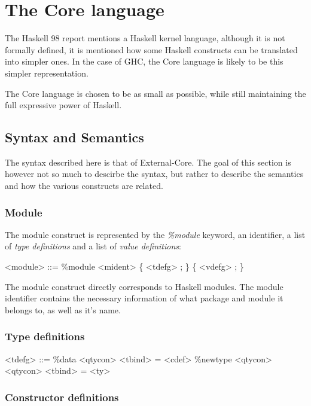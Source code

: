 
\chapter{The Core language}

The Haskell 98 report mentions a Haskell kernel language, although it is not
formally defined, it is mentioned how some Haskell constructs can be translated into
simpler ones. In the case of GHC, the Core language is likely to be this simpler 
representation.

The Core language is chosen to be as small as possible, while still maintaining 
the full expressive power of Haskell.

\section{Syntax and Semantics}

The syntax described here is that of External-Core. The goal of this section is
however not so much to descirbe the syntax, but rather to describe the semantics and 
how the various constructs are related.

\subsection{Module}

The module construct is represented by the \emph{\%module} keyword, an identifier,
a list of \emph{type definitions} and a list of \emph{value definitions}:

\begin{grammar}
<module> ::= \%module <mident> \{ <tdefg> ; \} \{ <vdefg> ; \}
\end{grammar}

The module construct directly corresponds to Haskell modules. The module identifier
contains the necessary information of what package and module it belongs to, as
well as it's name.

\subsection{Type definitions}

\begin{grammar}
<tdefg> ::= \%data <qtycon> <tbind> = <cdef>
       \alt \%newtype <qtycon> <qtycon> <tbind> = <ty>
\end{grammar}


\subsection{Constructor definitions}

